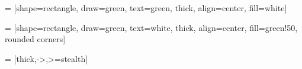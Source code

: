 
 = [shape=rectangle, draw=green, text=green, thick, 
	align=center, fill=white]

 = [shape=rectangle, draw=green, text=white, thick, 
	align=center, fill=green!50, rounded corners]



 = [thick,->,>=stealth]
